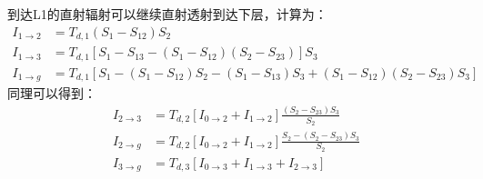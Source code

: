 到达L1的直射辐射可以继续直射透射到达下层，计算为：
\begin{equation}
\begin{aligned}
I_{1 \rightarrow 2} &=T_{d, 1}\left(S_{1}-S_{12}\right) S_{2} \\[1ex]
I_{1 \rightarrow 3}&=T_{d, 1}\left[S_{1}-S_{13}-\left(S_{1}-S_{12}\right)\left(S_{2}-S_{23}\right)\right] S_{3} \\[1ex]
I_{1 \rightarrow g} &=T_{d, 1}\left[S_{1}-\left(S_{1}-S_{12}\right) S_{2}-\left(S_{1}-S_{13}\right) S_{3}+\left(S_{1}-S_{12}\right)\left(S_{2}-S_{23}\right) S_{3}\right]
\end{aligned}
\end{equation}
同理可以得到：
\begin{equation}
\begin{aligned}
I_{2 \rightarrow 3} & =T_{d, 2}\left[I_{0 \rightarrow 2}+I_{1 \rightarrow 2}\right] \frac{\left(S_{2}-S_{23}\right) S_{3}}{S_{2}} \\[1ex]
I_{2 \rightarrow g} & =T_{d, 2}\left[I_{0 \rightarrow 2}+I_{1 \rightarrow 2}\right] \frac{S_{2}-\left(S_{2}-S_{23}\right) S_{3}}{S_{2}} \\[1ex] 
I_{3 \rightarrow g} &=T_{d, 3}\left[I_{0 \rightarrow 3}+I_{1 \rightarrow 3}+I_{2 \rightarrow 3}\right]
\end{aligned}
\end{equation}

